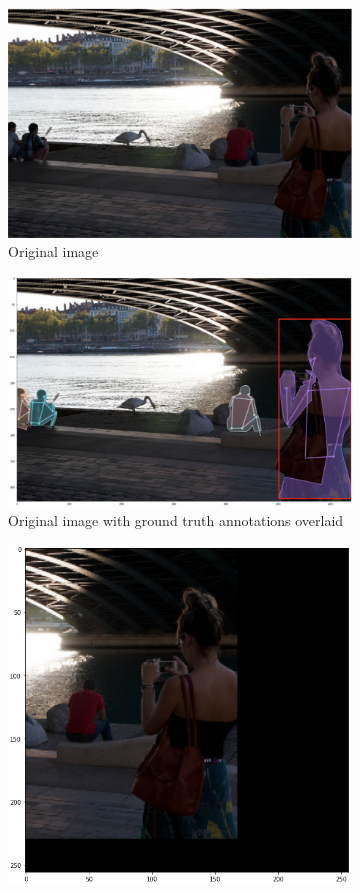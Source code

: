 \documentclass[11pt, letterpaper]{article}
\begin{document}
\begin{figure}[h]
    \centering
    \begin{subfigure}{0.4\textwidth}
        \includegraphics[width=0.8\linewidth]{original_image.png}
        \caption{Original image}
    \end{subfigure}
    \begin{subfigure}{0.4\textwidth}
        \includegraphics[width=0.8\linewidth]{original_w_gt.png}
        \caption{Original image with ground truth annotations overlaid}
    \end{subfigure}
    \begin{subfigure}{0.4\textwidth}
        \includegraphics[width=0.8\linewidth]{processed_image.png}

\end{subfigure}
\end{figure}
\end{document}

